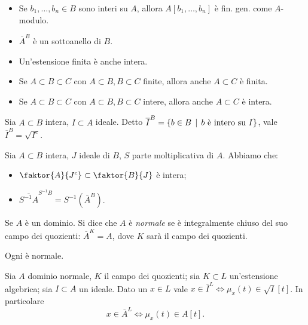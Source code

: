 \begin{proposition}$ $
    \begin{itemize}
        \item Se $b_1,\dots, b_n\in B$ sono interi su $A$, allora $A[b_1,\dots,b_n]$ è fin. gen. come $A$-modulo.
        \item $\overline{A}^B$ è un sottoanello di $B$.
        \item Un'estensione finita è anche intera.
        \item Se $A\subset B\subset C$ con $A\subset B, B\subset C$ finite, allora anche $A\subset C$ è finita.
        \item Se $A\subset B\subset C$ con $A\subset B, B\subset C$ intere, allora anche $A\subset C$ è intera.
    \end{itemize}
\end{proposition}

\begin{lemma}
    Sia $A\subset B$ intera, $I\subset A$ ideale. Detto $\overline{I}^B=\{ b\in B \operatorname{\; |\;} b \text{ è intero su } I \}$, vale $\overline{I}^B = \sqrt{I^e}$.
\end{lemma}

\begin{proposition} Sia $A\subset B$ intera, $ J $ ideale di $ B $, $ S $ parte moltiplicativa di $ A $. Abbiamo che:
    \begin{itemize}
        \item $\faktor{A}{J^c}\subset \faktor{B}{J}$ è intera;
        \item $\overline{S^{-1}A}^{S^{-1}B}=S^{-1}(\overline{A}^B) $.
    \end{itemize}
\end{proposition}

\begin{definition}[Normale]
    Se $A$ è un dominio. Si dice che $A$ è \emph{normale} se è integralmente chiuso del suo campo dei quozienti: $\overline{A}^K=A$, dove $ K $ sarà il campo dei quozienti.
\end{definition}

\begin{proposition}
    Ogni \ufd è normale.
\end{proposition}

\begin{theorem}
    Sia $A$ dominio normale, $K$ il campo dei quozienti; sia $K\subset L$ un'estensione algebrica; sia $I\subset A$ un ideale. Dato un $x\in L$ vale $x\in \overline{I}^L \iff \mu_x(t)\in \sqrt{I}[t]$. In particolare $$ x\in \overline{A}^L \iff \mu_x(t)\in A[t]. $$
\end{theorem}


